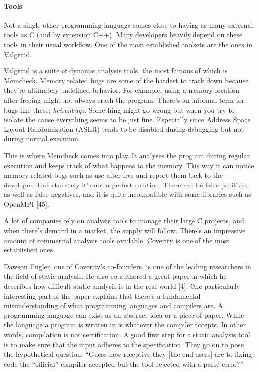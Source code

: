\documentclass[a4paper, 16pt, oneside]{Thesis}
\let\oldparagraph\paragraph
\renewcommand{\paragraph}[1]{\oldparagraph{#1}\mbox{}}
\begin{document}
\paragraph{Tools}\label{tools}

Not a single other programming language comes close to having as many
external tools as C (and by extension C++). Many developers heavily
depend on these tools in their usual workflow. One of the most
established toolsets are the ones in Valgrind.

Valgrind is a suite of dynamic analysis tools, the most famous of which
is Memcheck. Memory related bugs are some of the hardest to track down
because they're ultimately undefined behavior. For example, using a
memory location after freeing might not always crash the program.
There's an informal term for bugs like these: \emph{heisenbugs}.
Something might go wrong but when you try to isolate the cause
everything seems to be just fine. Especially since Address Space Layout
Randomization (ASLR) tends to be disabled during debugging but not
during normal execution.

This is where Memcheck comes into play. It analyses the program during
regular execution and keeps track of what happens to the memory. This
way it can notice memory related bugs such as use-after-free and report
them back to the developer. Unfortunately it's not a perfect solution.
There can be false positives as well as false negatives, and it is quite
incompatible with some libraries such as OpenMPI {[}45{]}.

A lot of companies rely on analysis tools to manage their large C
projects, and when there's demand in a market, the supply will follow.
There's an impressive amount of commercial analysis tools available.
Coverity is one of the most established ones.

Dawson Engler, one of Coverity's co-founders, is one of the leading
researchers in the field of static analysis. He also co-authored a great
paper in which he describes how difficult static analysis is in the real
world {[}4{]}. One particularly interesting part of the paper explains
that there's a fundamental misunderstanding of what programming
languages and compilers are. A programming language can exist as an
abstract idea or a piece of paper. While the language a program is
written in is whatever the compiler accepts. In other words, compilation
is not certification. A good first step for a static analysis tool is to
make sure that the input adheres to the specification. They go on to
pose the hypothetical question: ``Guess how receptive they {[}the
end-users{]} are to fixing code the ``official'' compiler accepted but
the tool rejected with a parse error?''
\end{document}
